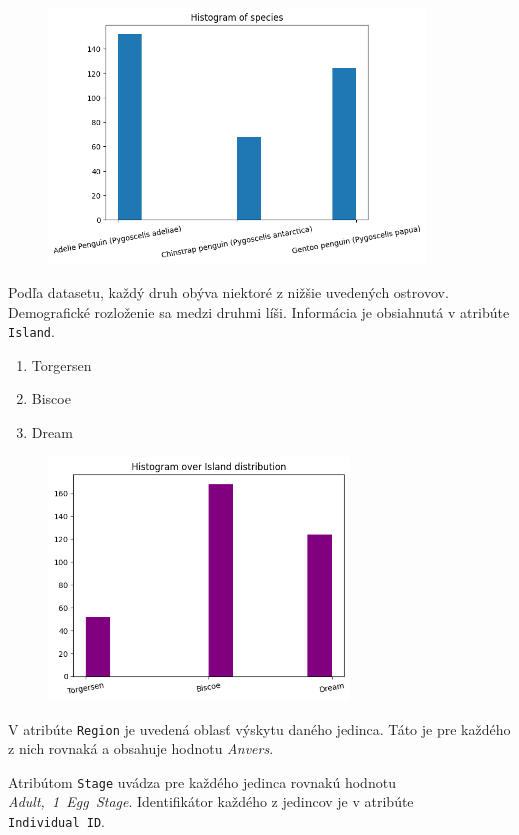 \documentclass[10pt,xcolor=pdflatex,dvipsnames,table,oneside]{book}
\begin{document}
\begin{figure}[h]
  \includegraphics[width=10cm]{img/species.png}
  \centering
\end{figure}
\pagebreak





Podľa datasetu, každý druh obýva niektoré z nižšie uvedených ostrovov. Demografické rozloženie sa medzi druhmi líši. Informácia je obsiahnutá v atribúte \texttt{Island}.
\begin{enumerate}
  \item Torgersen
  \item Biscoe
  \item Dream
\end{enumerate}

\begin{figure}[h]
  \includegraphics[width=8cm]{img/island.png}
  \centering
\end{figure}



V atribúte \texttt{Region} je uvedená oblasť výskytu daného jedinca. Táto je pre každého z nich rovnaká a obsahuje hodnotu \textit{Anvers}.

Atribútom \texttt{Stage} uvádza pre každého jedinca rovnakú hodnotu \textit{Adult,~1~Egg~Stage}. Identifikátor každého z jedincov je v atribúte \texttt{Individual~ID}.
\end{document}
